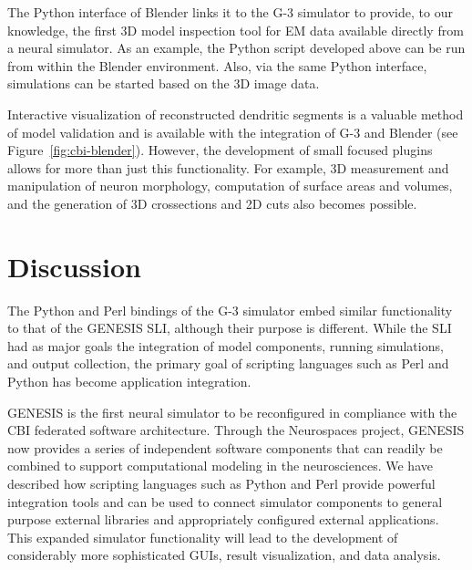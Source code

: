 \documentclass[10pt]{article}
\begin{document}
The Python interface of Blender links it to the G-3 simulator to
provide, to our knowledge, the first 3D model inspection tool for EM
data available directly from a neural simulator.  As an example, the
Python script developed above can be run from within the Blender
environment.  Also, via the same Python interface, simulations can be
started based on the 3D image data.

Interactive visualization of reconstructed dendritic segments is a
valuable method of model validation and is available with the
integration of G-3 and Blender (see Figure~\ref{fig:cbi-blender}).
However, the development of small focused plugins allows for more than
just this functionality. For example, 3D measurement and manipulation of
neuron morphology, computation of surface areas and volumes, and the
generation of 3D crossections and 2D cuts also becomes possible.

\section*{Discussion}

The Python and Perl bindings of the G-3 simulator embed similar
functionality to that of the GENESIS SLI, although their purpose is different.
While the SLI had as major goals the integration of model components,
running simulations, and output collection, the primary goal of
scripting languages such as Perl and Python has become application
integration.

GENESIS is the first neural simulator to be reconfigured in compliance
with the CBI federated software architecture. Through the Neurospaces
project, GENESIS now provides a series of independent software
components that can readily be combined to support computational
modeling in the neurosciences.  We have described how scripting
languages such as Python and Perl provide powerful integration tools
and can be used to connect simulator components to general purpose
external libraries and appropriately configured external applications.
This expanded simulator functionality will lead to the development of
considerably more sophisticated GUIs, result visualization, and data
analysis.

\end{document}
